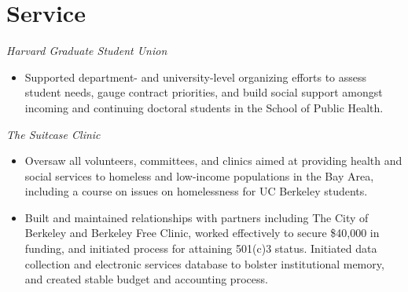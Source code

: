 \documentclass{cv_style}
\begin{document}

\section{Service}

\textit{Harvard Graduate Student Union}
\begin{itemize}
    \item Supported department- and university-level organizing efforts to assess student needs, gauge contract priorities, and build social support amongst incoming and continuing doctoral students in the School of Public Health. 
\end{itemize}

\textit{The Suitcase Clinic}
\begin{itemize}
    \item Oversaw all volunteers, committees, and clinics aimed at providing health and social services to homeless and low-income populations in the Bay Area, including a course on issues on homelessness for UC Berkeley  students. 
    \item \parskip 1pt Built and maintained relationships with partners including The City of Berkeley and Berkeley Free Clinic, worked effectively to secure \$40,000 in funding, and initiated process for attaining 501(c)3 status. Initiated data collection and electronic services database to bolster institutional memory, and created stable budget and accounting process.
\end{itemize}

\end{document}
